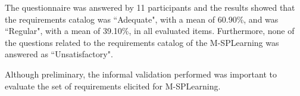 
The questionnaire was answered by 11 participants and the results showed that the requirements catalog was ``Adequate", with a mean of 60.90\%, and was ``Regular", with a mean of 39.10\%, in all evaluated items. Furthermore, none of the questions related to the requirements catalog of the M-SPLearning was answered as ``Unsatisfactory". 

%
%
Although preliminary, the informal validation performed was important to evaluate the set of requirements elicited for M-SPLearning.

